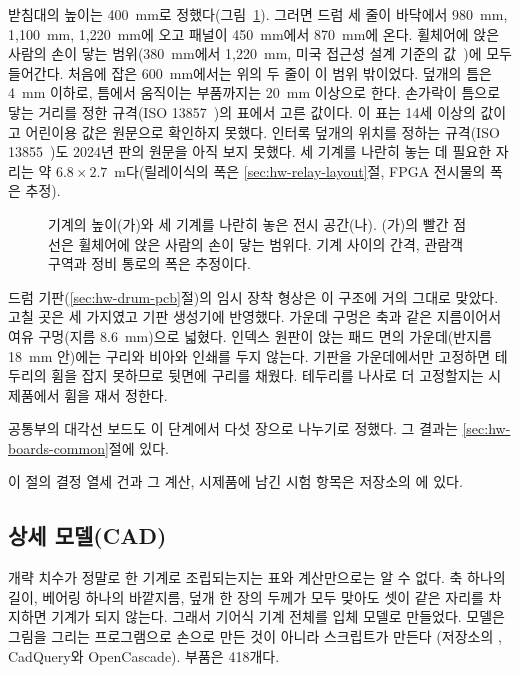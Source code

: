 받침대의 높이는 400~mm로 정했다(그림~\ref{fig:hw-gear-dim-site}). 그러면 드럼 세 줄이 바닥에서 980~mm,
1,100~mm, 1,220~mm에 오고 패널이 450~mm에서 870~mm에 온다. 휠체어에 앉은 사람의 손이 닿는 범위(380~mm에서
1,220~mm, 미국 접근성 설계 기준의 값~\cite{ada2010-308})에 모두 들어간다. 처음에 잡은 600~mm에서는 위의 두 줄이 이 범위 밖이었다.
덮개의 틈은 4~mm 이하로, 틈에서 움직이는 부품까지는 20~mm 이상으로 한다. 손가락이 틈으로 닿는 거리를 정한
규격(ISO 13857~\cite{iso13857})의 표에서 고른 값이다. 이 표는 14세 이상의 값이고 어린이용 값은 원문으로 확인하지
못했다. 인터록 덮개의 위치를 정하는 규격(ISO 13855~\cite{iso13855})도 2024년 판의 원문을 아직 보지 못했다. 세 기계를
나란히 놓는 데 필요한 자리는 약 $6.8 \times 2.7$~m다(릴레이식의 폭은 \ref{sec:hw-relay-layout}절, FPGA 전시물의
폭은 추정).

\begin{figure}[ht]
\centering

\caption{기계의 높이(가)와 세 기계를 나란히 놓은 전시 공간(나). (가)의 빨간 점선은 휠체어에 앉은 사람의 손이
닿는 범위다. 기계 사이의 간격, 관람객 구역과 정비 통로의 폭은 추정이다.}
\label{fig:hw-gear-dim-site}
\end{figure}

드럼 기판(\ref{sec:hw-drum-pcb}절)의 임시 장착 형상은 이 구조에 거의 그대로 맞았다. 고칠 곳은 세 가지였고
기판 생성기에 반영했다. 가운데 구멍은 축과 같은 지름이어서 여유 구멍(지름 8.6~mm)으로 넓혔다. 인덱스 원판이
앉는 패드 면의 가운데(반지름 18~mm 안)에는 구리와 비아와 인쇄를 두지 않는다. 기판을 가운데에서만 고정하면
테두리의 휨을 잡지 못하므로 뒷면에 구리를 채웠다. 테두리를 나사로 더 고정할지는 시제품에서 휨을 재서 정한다.

공통부의 대각선 보드도 이 단계에서 다섯 장으로 나누기로 정했다. 그 결과는 \ref{sec:hw-boards-common}절에 있다.

이 절의 결정 열세 건과 그 계산, 시제품에 남긴 시험 항목은 저장소의
에 있다.

\subsection{상세 모델(CAD)}\label{sec:hw-gear-cad}

개략 치수가 정말로 한 기계로 조립되는지는 표와 계산만으로는 알 수 없다. 축 하나의 길이, 베어링 하나의 바깥지름,
덮개 한 장의 두께가 모두 맞아도 셋이 같은 자리를 차지하면 기계가 되지 않는다. 그래서 기어식 기계 전체를 입체
모델로 만들었다. 모델은 그림을 그리는 프로그램으로 손으로 만든 것이 아니라 스크립트가 만든다
(저장소의 , CadQuery와 OpenCascade). 부품은 418개다.

